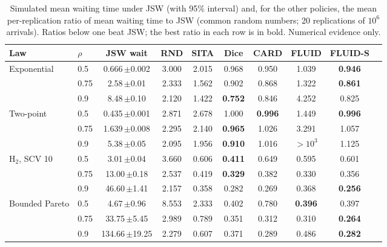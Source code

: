 \begin{table}[t]
\centering\footnotesize\setlength{\tabcolsep}{3.2pt}
\caption{Simulated mean waiting time under JSW (with 95\% interval) and, for the other policies, the mean per-replication ratio of mean waiting time to JSW (common random numbers; 20 replications of $10^6$ arrivals). Ratios below one beat JSW; the best ratio in each row is in bold. Numerical evidence only.}\label{tab:sim}
\begin{tabular}{@{}llcccccccc@{}}
\toprule
Law & $\rho$ & JSW wait & RND & SITA & Dice & CARD & FLUID & FLUID-S\\
\midrule
Exponential & 0.5 & 0.666\,$\pm$0.002 & 3.000 & 2.015 & 0.968 & 0.950 & 1.039 & \textbf{0.946}\\
 & 0.75 & 2.58\,$\pm$0.01 & 2.333 & 1.562 & 0.902 & 0.868 & 1.322 & \textbf{0.861}\\
 & 0.9 & 8.48\,$\pm$0.10 & 2.120 & 1.422 & \textbf{0.752} & 0.846 & 4.252 & 0.825\\
\addlinespace[2pt]
Two-point & 0.5 & 0.435\,$\pm$0.001 & 2.871 & 2.678 & 1.000 & \textbf{0.996} & 1.449 & \textbf{0.996}\\
 & 0.75 & 1.639\,$\pm$0.008 & 2.295 & 2.140 & \textbf{0.965} & 1.026 & 3.291 & 1.057\\
 & 0.9 & 5.38\,$\pm$0.05 & 2.095 & 1.956 & \textbf{0.910} & 1.016 & $>10^3$ & 1.125\\
\addlinespace[2pt]
H$_2$, SCV 10 & 0.5 & 3.01\,$\pm$0.04 & 3.660 & 0.606 & \textbf{0.411} & 0.649 & 0.595 & 0.601\\
 & 0.75 & 13.00\,$\pm$0.18 & 2.537 & 0.419 & \textbf{0.329} & 0.382 & 0.330 & 0.356\\
 & 0.9 & 46.60\,$\pm$1.41 & 2.157 & 0.358 & 0.282 & 0.269 & 0.368 & \textbf{0.256}\\
\addlinespace[2pt]
Bounded Pareto & 0.5 & 4.67\,$\pm$0.96 & 8.553 & 2.333 & 0.402 & 0.780 & \textbf{0.396} & 0.397\\
 & 0.75 & 33.75\,$\pm$5.45 & 2.989 & 0.789 & 0.351 & 0.312 & 0.310 & \textbf{0.264}\\
 & 0.9 & 134.66\,$\pm$19.25 & 2.279 & 0.607 & 0.371 & 0.289 & 0.486 & \textbf{0.282}\\
\bottomrule
\end{tabular}
\end{table}


